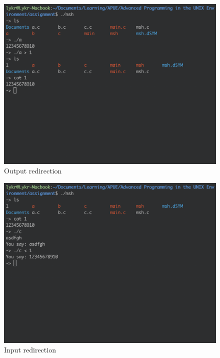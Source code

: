 \documentclass{article}
\begin{document}
\begin{figure}[h]
\centering
\includegraphics[scale=0.5]{fig/v4-1.png}
\caption{Output redirection}
\end{figure}

\newpage
\begin{figure}[h]
\centering
\includegraphics[scale=0.4]{fig/v4-2.png}
\caption{Input redirection}
\end{figure}
\end{document}
